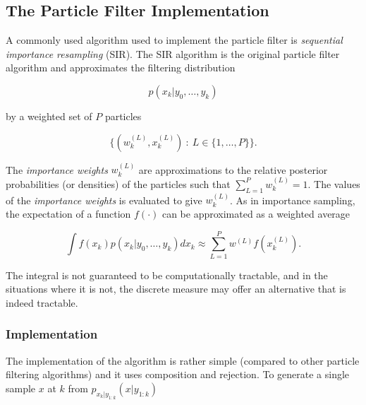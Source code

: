 \subsection{The Particle Filter Implementation}

A commonly used algorithm used to implement the particle filter is
\emph{sequential importance resampling} (SIR). The SIR algorithm is the 
original particle filter algorithm and approximates the filtering distribution

\begin{equation}
p(x_k|y_0,\ldots,y_k)
\end{equation}

by a weighted set of $P$ particles

\begin{equation}
\{(w^{(L)}_k,x^{(L)}_k)~:~L\in\{1,\ldots,P\}\}.
\end{equation}

The \emph{importance weights} $w^{(L)}_k$ are approximations to the relative
posterior probabilities (or densities) of the particles such that 
$\sum_{L=1}^P w^{(L)}_k = 1$. The values of the \emph{importance weights} is
evaluated to give $w^{(L)}_k$. As in importance sampling, the expectation of a
function $f(\cdot)$ can be approximated as a weighted average

\begin{equation}
\int f(x_k) p(x_k|y_0,\dots,y_k) dx_k \approx \sum_{L=1}^P w^{(L)} f(x_k^{(L)}).
\end{equation}

The integral is not guaranteed to be computationally tractable, and in the 
situations where it is not, the discrete measure may offer an alternative
that is indeed tractable.


\subsubsection{Implementation}
The implementation of the algorithm is rather simple (compared to other particle
filtering algorithms) and it uses composition and rejection.  To generate a
single sample $x$ at $k$ from $p_{x_k|y_{1:k}}(x|y_{1:k})$


